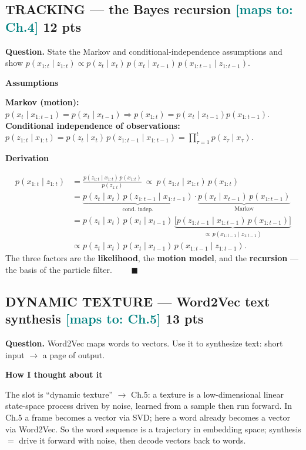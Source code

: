\documentclass[11pt]{article}
\newcommand{\step}[1]{\smallskip\par\noindent\textbf{\textcolor{amber}{#1}}\par\nobreak}
\newcommand{\maps}[1]{{\small\textcolor{teal}{[maps to: #1]}}}
\begin{document}
\subsection{TRACKING --- the Bayes recursion \hfill \maps{Ch.4} \hfill \textnormal{\small 12 pts}}
\begin{qbox}\textbf{Question.} State the Markov and conditional-independence assumptions and show
$p(x_{1:t}\mid z_{1:t})\propto p(z_t\mid x_t)\,p(x_t\mid x_{t-1})\,p(x_{1:t-1}\mid z_{1:t-1})$.\end{qbox}

\step{Assumptions}
\textbf{Markov (motion):} $p(x_t\mid x_{1:t-1})=p(x_t\mid x_{t-1})\Rightarrow p(x_{1:t})=p(x_t\mid x_{t-1})p(x_{1:t-1})$.\\
\textbf{Conditional independence of observations:} $p(z_{1:t}\mid x_{1:t})=p(z_t\mid x_t)\,p(z_{1:t-1}\mid x_{1:t-1})=\prod_{\tau=1}^{t}p(z_\tau\mid x_\tau)$.

\step{Derivation}
\begin{align*}
p(x_{1:t}\mid z_{1:t})
&=\frac{p(z_{1:t}\mid x_{1:t})\,p(x_{1:t})}{p(z_{1:t})}\ \propto\ p(z_{1:t}\mid x_{1:t})\,p(x_{1:t})\\
&=\underbrace{p(z_t\mid x_t)\,p(z_{1:t-1}\mid x_{1:t-1})}_{\text{cond.\ indep.}}\cdot
  \underbrace{p(x_t\mid x_{t-1})\,p(x_{1:t-1})}_{\text{Markov}}\\
&=p(z_t\mid x_t)\,p(x_t\mid x_{t-1})\,
  \underbrace{\big[p(z_{1:t-1}\mid x_{1:t-1})\,p(x_{1:t-1})\big]}_{\propto\,p(x_{1:t-1}\mid z_{1:t-1})}\\
&\propto p(z_t\mid x_t)\,p(x_t\mid x_{t-1})\,p(x_{1:t-1}\mid z_{1:t-1}).
\end{align*}
The three factors are the \textbf{likelihood}, the \textbf{motion model}, and the \textbf{recursion} --- the basis
of the particle filter. $\qquad\blacksquare$

\subsection{DYNAMIC TEXTURE --- Word2Vec text synthesis \hfill \maps{Ch.5} \hfill \textnormal{\small 13 pts}}
\begin{qbox}\textbf{Question.} Word2Vec maps words to vectors. Use it to synthesize text: short input $\to$ a page
of output.\end{qbox}

\step{How I thought about it}
The slot is ``dynamic texture'' $\to$ Ch.5: a texture is a low-dimensional linear state-space process driven by
noise, learned from a sample then run forward. In Ch.5 a frame becomes a vector via SVD; here a word already
becomes a vector via Word2Vec. So the word sequence is a trajectory in embedding space; synthesis $=$ drive it
forward with noise, then decode vectors back to words.
\end{document}
